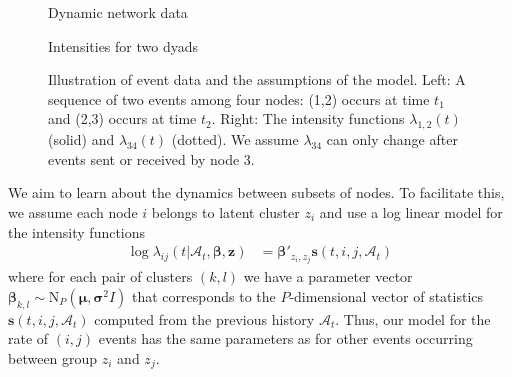 \begin{figure}
\centering
\begin{minipage}[b]{0.45\linewidth}
  \caption{Dynamic network data}
\end{minipage}
\begin{minipage}[b]{0.45\linewidth}
\caption{Intensities for two dyads}
\end{minipage}
\caption[]{Illustration of event data and the assumptions of the model.  Left: A sequence of two events among four nodes: (1,2) occurs at time $t_1$ and (2,3) occurs at time $t_2$.  Right: The intensity functions $\lambda_{1,2}(t)$ (solid) and $\lambda_{34}(t)$ (dotted).  We assume $\lambda_{34}$ can only change after events sent or received by node 3.\footnotemark }
\label{fig:example}
\end{figure}

We aim to learn about the dynamics between subsets of nodes.   To facilitate this, we assume each node $i$ belongs to latent cluster $z_i$ and use a log linear model for the intensity functions
\begin{align*}
\log \lambda_{ij}(t | \mathcal{A}_t,\mathbf{\beta},\mathbf{z}) &= \boldsymbol{\beta}'_{z_i,z_j} \mathbf{s}(t,i,j,\mathcal{A}_t)
\end{align*}
where for each pair of clusters $(k,l)$ we have a parameter vector $\boldsymbol{\beta}_{k,l} \sim \mbox{N}_P(\boldsymbol{\mu},\boldsymbol{\sigma}^2I)$ that corresponds to the $P$-dimensional vector of statistics $\mathbf{s}(t,i,j,\mathcal{A}_t)$ computed from the previous history $\mathcal{A}_t$.
Thus, our model for the rate of $(i,j)$ events has the same parameters as for other events occurring between group $z_i$ and $z_j$.

